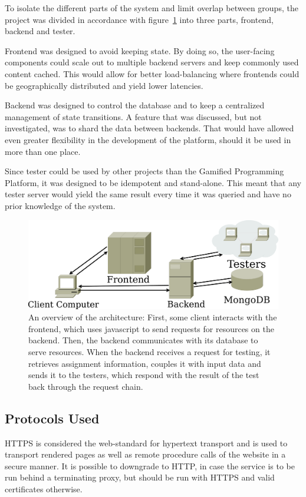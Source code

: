 To isolate the different parts of the system and limit overlap between groups, the project was divided in accordance with figure~\ref{fig:architecture} into three parts, frontend, backend and tester.

Frontend was designed to avoid keeping state. By doing so, the user-facing components could scale out to multiple backend servers and keep commonly used content cached. This would allow for better load-balancing where frontends could be geographically distributed and yield lower latencies.

Backend was designed to control the database and to keep a centralized management of state transitions. A feature that was discussed, but not investigated, was to shard the data between backends. That would have allowed even greater flexibility in the development of the platform, should it be used in more than one place.

Since tester could be used by other projects than the Gamified Programming Platform, it was designed to be idempotent and stand-alone. This meant that any tester server would yield the same result every time it was queried and have no prior knowledge of the system.
\begin{figure}
    \centering
    \includegraphics[width=.9\textwidth]{img/architecture.pdf}
    \caption{An overview of the architecture: First, some client interacts with the frontend, which uses javascript to send requests for resources on the backend. Then, the backend communicates with its database to serve resources. When the backend receives a request for testing, it retrieves assignment information, couples it with input data and sends it to the testers, which respond with the result of the test back through the request chain.}\label{fig:architecture}
\end{figure}

\subsection{Protocols Used}
HTTPS is considered the web-standard for hypertext transport and is used to transport rendered pages as well as remote procedure calls of the website in a secure manner. It is possible to downgrade to HTTP, in case the service is to be run behind a terminating proxy, but should be run with HTTPS and valid certificates otherwise.

